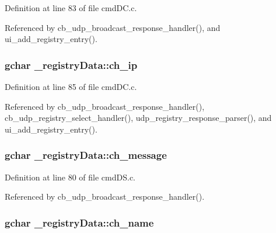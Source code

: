 Definition at line 83 of file cmd\+D\+C.\+c.



Referenced by cb\+\_\+udp\+\_\+broadcast\+\_\+response\+\_\+handler(), and ui\+\_\+add\+\_\+registry\+\_\+entry().

\hypertarget{struct__registry_data_a814e064e77a6aac5866c88cb51acd971}{
\subsubsection[{ch\+\_\+ip}]{\setlength{\rightskip}{0pt plus 5cm}gchar \+\_\+registry\+Data\+::ch\+\_\+ip}}\label{struct__registry_data_a814e064e77a6aac5866c88cb51acd971}


Definition at line 85 of file cmd\+D\+C.\+c.



Referenced by cb\+\_\+udp\+\_\+broadcast\+\_\+response\+\_\+handler(), cb\+\_\+udp\+\_\+registry\+\_\+select\+\_\+handler(), udp\+\_\+registry\+\_\+response\+\_\+parser(), and ui\+\_\+add\+\_\+registry\+\_\+entry().

\hypertarget{struct__registry_data_ae9b0c1e6f13d980dcc7515def6b20b5e}{
\subsubsection[{ch\+\_\+message}]{\setlength{\rightskip}{0pt plus 5cm}gchar \+\_\+registry\+Data\+::ch\+\_\+message}}\label{struct__registry_data_ae9b0c1e6f13d980dcc7515def6b20b5e}


Definition at line 80 of file cmd\+D\+S.\+c.



Referenced by cb\+\_\+udp\+\_\+broadcast\+\_\+response\+\_\+handler().

\hypertarget{struct__registry_data_a4764e2a72c3ba9177b6c4803cfa03f72}{
\subsubsection[{ch\+\_\+name}]{\setlength{\rightskip}{0pt plus 5cm}gchar \+\_\+registry\+Data\+::ch\+\_\+name}}\label{struct__registry_data_a4764e2a72c3ba9177b6c4803cfa03f72}


